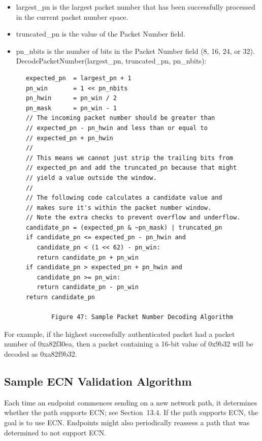 \documentclass{article}
\begin{document}
\begin{itemize}
\item largest\_pn is the largest packet number that has been successfully processed in the current packet number space.
\item truncated\_pn is the value of the Packet Number field.
\item pn\_nbits is the number of bits in the Packet Number field (8, 16, 24, or 32).
DecodePacketNumber(largest\_pn, truncated\_pn, pn\_nbits):

\end{itemize}
\begin{verbatim}
      expected_pn  = largest_pn + 1
      pn_win       = 1 << pn_nbits
      pn_hwin      = pn_win / 2
      pn_mask      = pn_win - 1
      // The incoming packet number should be greater than
      // expected_pn - pn_hwin and less than or equal to
      // expected_pn + pn_hwin
      //
      // This means we cannot just strip the trailing bits from
      // expected_pn and add the truncated_pn because that might
      // yield a value outside the window.
      //
      // The following code calculates a candidate value and
      // makes sure it's within the packet number window.
      // Note the extra checks to prevent overflow and underflow.
      candidate_pn = (expected_pn & ~pn_mask) | truncated_pn
      if candidate_pn <= expected_pn - pn_hwin and
         candidate_pn < (1 << 62) - pn_win:
         return candidate_pn + pn_win
      if candidate_pn > expected_pn + pn_hwin and
         candidate_pn >= pn_win:
         return candidate_pn - pn_win
      return candidate_pn

             Figure 47: Sample Packet Number Decoding Algorithm
\end{verbatim}

For example, if the highest successfully authenticated packet had a packet number of 0xa82f30ea, then a packet containing a 16-bit value of 0x9b32 will be decoded as 0xa82f9b32.

\subsection{Sample ECN Validation Algorithm}

Each time an endpoint commences sending on a new network path, it determines whether the path supports ECN; see Section~13.4.  If the path supports ECN, the goal is to use ECN.  Endpoints might also periodically reassess a path that was determined to not support ECN.
\end{document}
